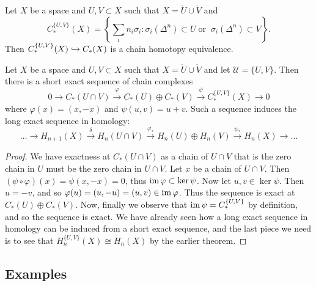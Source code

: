 \begin{theorem}
	Let $X$ be a space and $U, V \subset X$ such that $X = \mathring U \cup \mathring V$ and
	\[
		C_*^{\{U, V\}}(X) = \left\{
		\sum_i n_i \sigma_i:
		\sigma_i(\Delta^n) \subset U \;\text{or}\;\; \sigma_i(\Delta^n) \subset V
		\right\}.
	\]
	Then $C_*^{\{U, V\}}(X) \xhookrightarrow{} C_*(X)$ is a chain homotopy equivalence.
\end{theorem}

\begin{theorem}
	Let $X$ be a space and $U, V \subset X$ such that $X = \mathring U \cup \mathring V$ and let $\mathcal U = \{U, V\}$. Then there is a short exact sequence of chain complexes
	\[
		0 \to C_*(U \cap V)
		\xrightarrow{\varphi} C_*(U) \oplus C_*(V)
		\xrightarrow{\psi} C_*^{\{U, V\}}(X)
		\to 0
	\]
	where $\varphi(x) = (x, -x)$ and $\psi(u, v) = u + v$. Such a sequence induces the long exact sequence in homology:
	\[
		\ldots \to H_{n+1}(X) \xrightarrow{\delta} H_n(U \cap V)
		\xrightarrow{\varphi_*} H_n(U) \oplus H_n(V)
		\xrightarrow{\psi_*} H_n(X)
		\to \ldots
	\]
\end{theorem}

\begin{proof}
	We have exactness at $C_*(U \cap V)$ as a chain of $U \cap V$ that is the zero chain in $U$ must be the zero chain in $U \cap V$. Let $x$ be a chain of $U \cap V$. Then $(\psi \circ \varphi)(x) = \psi(x, -x) = 0$, thus $\operatorname{im} \varphi \subset \ker\psi$. Now let $u, v \in \ker\psi$. Then $u = -v$, and so $\varphi(u) = (u, -u) = (u,v) \in\operatorname{im}\varphi$. Thus the sequence is exact at $C_*(U) \oplus C_*(V)$. Now, finally we observe that $\operatorname{im}\psi = C_*^{\{U, V\}}$ by definition, and so the sequence is exact. We have already seen how a long exact sequence in homology can be induced from a short exact sequence, and the last piece we need is to see that $H_n^{\{U, V\}}(X) \cong H_n(X)$ by the earlier theorem.
\end{proof}

\subsection{Examples}

